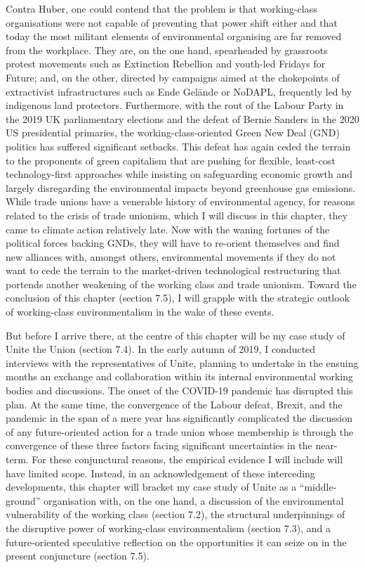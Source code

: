 \documentclass[a4paper, nobind]{templates/ociamthesis}
\begin{document}
Contra Huber, one could contend that the problem is that working-class organisations were not capable of preventing that power shift either and that today the most militant elements of environmental organising are far removed from the workplace. They are, on the one hand, spearheaded by grassroots protest movements such as Extinction Rebellion and youth-led Fridays for Future; and, on the other, directed by campaigns aimed at the chokepoints of extractivist infrastructures such as Ende Gelände or NoDAPL, frequently led by indigenous land protectors. Furthermore, with the rout of the Labour Party in the 2019 UK parliamentary elections and the defeat of Bernie Sanders in the 2020 US presidential primaries, the working-class-oriented Green New Deal (GND) politics has suffered significant setbacks. This defeat has again ceded the terrain to the proponents of green capitalism that are pushing for flexible, least-cost technology-first approaches while insisting on safeguarding economic growth and largely disregarding the environmental impacts beyond greenhouse gas emissions. While trade unions have a venerable history of environmental agency, for reasons related to the crisis of trade unionism, which I will discuss in this chapter, they came to climate action relatively late. Now with the waning fortunes of the political forces backing GNDs, they will have to re-orient themselves and find new alliances with, amongst others, environmental movements if they do not want to cede the terrain to the market-driven technological restructuring that portends another weakening of the working class and trade unionism. Toward the conclusion of this chapter (section 7.5), I will grapple with the strategic outlook of working-class environmentalism in the wake of these events.

But before I arrive there, at the centre of this chapter will be my case study of Unite the Union (section 7.4). In the early autumn of 2019, I conducted interviews with the representatives of Unite, planning to undertake in the ensuing months an exchange and collaboration within its internal environmental working bodies and discussions. The onset of the COVID-19 pandemic has disrupted this plan. At the same time, the convergence of the Labour defeat, Brexit, and the pandemic in the span of a mere year has significantly complicated the discussion of any future-oriented action for a trade union whose membership is through the convergence of these three factors facing significant uncertainties in the near-term. For these conjunctural reasons, the empirical evidence I will include will have limited scope. Instead, in an acknowledgement of these interceding developments, this chapter will bracket my case study of Unite as a ``middle-ground'' organisation with, on the one hand, a discussion of the environmental vulnerability of the working class (section 7.2), the structural underpinnings of the disruptive power of working-class environmentalism (section 7.3), and a future-oriented speculative reflection on the opportunities it can seize on in the present conjuncture (section 7.5).
\end{document}
